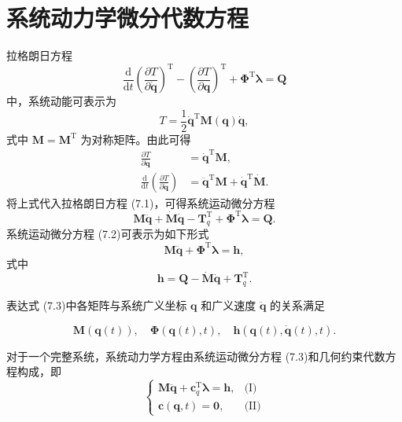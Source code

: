 \section{系统动力学微分代数方程}
拉格朗日方程
\[
\frac{\mathrm{d}}{\mathrm{d}t}\left(\frac{\partial T}{\partial \dot{\boldsymbol{q}}}\right)^{\!\mathrm{T}}
    - \left(\frac{\partial T}{\partial \boldsymbol{q}}\right)^{\!\mathrm{T}}
    + \boldsymbol{\Phi}^{\mathrm{T}}\boldsymbol{\lambda} = \boldsymbol{Q}
\]
中，系统动能可表示为
\[
T = \frac{1}{2}\dot{\boldsymbol{q}}^{\mathrm{T}}\boldsymbol{M}(\boldsymbol{q})\dot{\boldsymbol{q}},
\]
式中 $\boldsymbol{M} = \boldsymbol{M}^{\mathrm{T}}$ 为对称矩阵。由此可得
\begin{align*}\frac{\partial T}{\partial \dot{\boldsymbol{q}}} &= \dot{\boldsymbol{q}}^{\mathrm{T}}\boldsymbol{M}, \\[6pt]
    \frac{\mathrm{d}}{\mathrm{d}t}\left(\frac{\partial T}{\partial \dot{\boldsymbol{q}}}\right) &= \ddot{\boldsymbol{q}}^{\mathrm{T}}\boldsymbol{M} + \dot{\boldsymbol{q}}^{\mathrm{T}}\dot{\boldsymbol{M}}.\end{align*}
将上式代入拉格朗日方程 (7.1)，可得系统运动微分方程
\[
\boldsymbol{M}\ddot{\boldsymbol{q}} + \dot{\boldsymbol{M}}\dot{\boldsymbol{q}} - \boldsymbol{T}_q^{\mathrm{T}} + \boldsymbol{\Phi}^{\mathrm{T}}\boldsymbol{\lambda} = \boldsymbol{Q}.
\]
系统运动微分方程 (7.2)可表示为如下形式
\begin{equation*}
\boxed{\boldsymbol{M}\ddot{\boldsymbol{q}} + \boldsymbol{\Phi}^{\mathrm{T}}\boldsymbol{\lambda} = \boldsymbol{h}},
    \tag{I}
\end{equation*}
式中
\[
\boldsymbol{h} = \boldsymbol{Q} - \dot{\boldsymbol{M}}\dot{\boldsymbol{q}} + \boldsymbol{T}_q^{\mathrm{T}}.
\]
\begin{note}
表达式 (7.3)中各矩阵与系统广义坐标 $\boldsymbol{q}$ 和广义速度 $\ddot{\boldsymbol{q}}$ 的关系满足

\[
\boldsymbol{M}(\boldsymbol{q}(t)),\quad \boldsymbol{\Phi}(\boldsymbol{q}(t),t),\quad \boldsymbol{h}(\boldsymbol{q}(t),\dot{\boldsymbol{q}}(t),t).
\]
\end{note}
对于一个完整系统，系统动力学方程由系统运动微分方程 (7.3)和几何约束代数方程构成，即
\[
\begin{cases}
        \boldsymbol{M}\ddot{\boldsymbol{q}} + \boldsymbol{c}_q^{\mathrm{T}}\boldsymbol{\lambda} = \boldsymbol{h}, & \text{(I)}\\[4pt]
        \boldsymbol{c}(\boldsymbol{q},t) = \boldsymbol{0}, & \text{(II)}
    \end{cases}
\]
